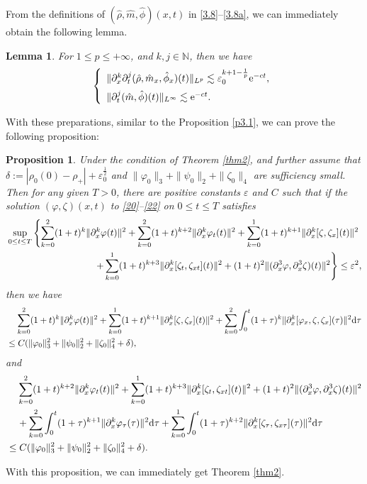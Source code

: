 \documentclass[11pt]{article}
\theoremstyle{plain}
\newtheorem{lemma}{Lemma}[section]
\newtheorem{proposition}{Proposition}[section]
\numberwithin{equation}{section}
\begin{document}
	From the definitions of $(\hat\rho,\hat m,\hat\phi)(x,t)$ in \eqref{3.8}--\eqref{3.8a}, we can immediately obtain the following lemma.
	\begin{lemma}\label{l4.2}
		For $1\leq p\leq +\infty$, and $k,j \in \mathbb{N}$, then we have
		\begin{equation}\label{14.3}
			\left\{
			\begin{array}{lr}
				\|\partial_x^k\partial_t^j(\hat\rho, \hat m_x, \hat\phi_x)(t)\|_{L^p}\lesssim \varepsilon_{0}^{k+1-\frac{1}{p}}{\rm e}^{-ct},\\[2mm]
				\|\partial_t^j(\hat m,\hat\phi)(t)\|_{L^{\infty}}\lesssim{\rm e}^{-ct}.
			\end{array}
			\right.
		\end{equation}
	\end{lemma}
	With these preparations, similar to the Proposition \ref{p3.1}, we can prove the following proposition:
	\begin{proposition}\label{p3.2}
		Under the condition of Theorem \ref{thm2},  and further assume that $\delta:=\left|\rho_{0}(0)-\rho_+\right|+\varepsilon_0^{\frac{1}{2}}$ and $\|\varphi_{0}\|_{3}+\|\psi_{0}\|_{2}+\|\zeta_{0}\|_{4}$ are sufficiency small. 
		Then for any given $T>0$, there are positive constants $\varepsilon$ and $C$ such that if the solution $(\varphi, \zeta)(x, t)$ to \eqref{20}--\eqref{22} on $0\leq t\leq T$ satisfies
		\begin{align}\label{13.15}
		&\sup_{0\leq t\leq T}\left\{\sum_{k=0}^{2}(1+t)^{k}\|\partial_x^k\varphi(t)\|^2+\sum_{k=0}^{2}(1+t)^{k+2}\|\partial_x^k\varphi_t(t)\|^2+\sum_{k=0}^{1}(1+t)^{k+1}\|\partial_x^k[\zeta,\zeta_x](t)\|^2\notag\right.\\ 
		&\ \ \ \ \ \ \ \ \ \ \ \ \ \ \ \ \ \ \ \ \ \ \ \ \ \ \ \ \left.+\sum_{k=0}^{1}(1+t)^{k+3}\|\partial_x^k[\zeta_t,\zeta_{xt}](t)\|^2+(1+t)^{2}\|(\partial_x^3\varphi,\partial_x^3\zeta)(t)\|^2\right\}\leq \varepsilon^2,\notag
		\end{align}
		then we have
		\begin{align}\notag
			&\;\;\;\;\sum_{k=0}^{2}(1+t)^{k}\|\partial_x^k\varphi(t)\|^2+\sum_{k=0}^{1}(1+t)^{k+1}\|\partial_x^k[\zeta,\zeta_x](t)\|^2+\sum_{k=0}^{2}\int_{0}^{t}(1+\tau)^k\|\partial_x^k[\varphi_x,\zeta,\zeta_x](\tau)\|^2{\rm d}\tau\notag\\
			&\leq C(\|\varphi_0\|_3^2+\|\psi_0\|_2^2+\|\zeta_0\|_4^2+\delta),\notag
		\end{align}
		and
		\begin{align}
			&\;\;\;\;\sum_{k=0}^{2}(1+t)^{k+2}\|\partial_x^k\varphi_t(t)\|^2+\sum_{k=0}^{1}(1+t)^{k+3}\|\partial_x^k[\zeta_t,\zeta_{xt}](t)\|^2+(1+t)^{2}\|(\partial_x^3\varphi,\partial_x^3\zeta)(t)\|^2\notag\\
			&\;\;\;\;+\sum_{k=0}^{2}\int_{0}^{t}(1+\tau)^{k+1}\|\partial_x^k\varphi_{\tau}(\tau)\|^2{\rm d}\tau+\sum_{k=0}^{1}\int_{0}^{t}(1+\tau)^{k+2}\|\partial_x^k[\zeta_{\tau},\zeta_{x\tau}](\tau)\|^2{\rm d}\tau\notag\\
			&\leq C(\|\varphi_0\|_3^2+\|\psi_0\|_2^2+\|\zeta_0\|_4^2+\delta).\notag
		\end{align}
	\end{proposition}
	With this proposition, we can immediately get Theorem \ref{thm2}.
	
\end{document}
